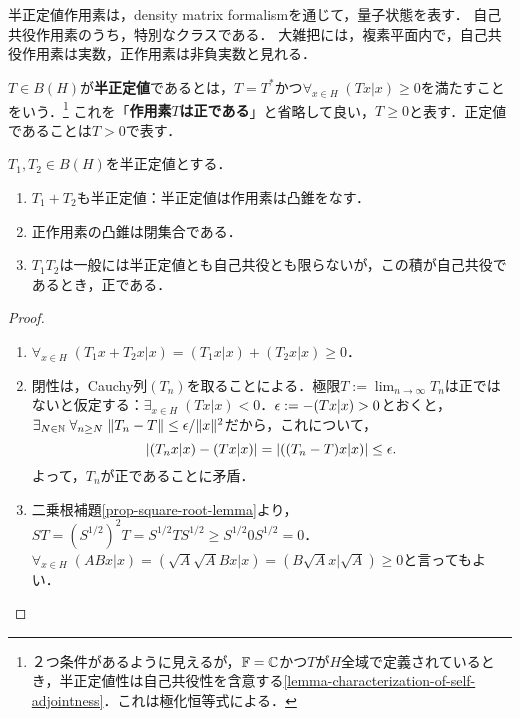 \documentclass[uplatex,dvipdfmx]{jsreport}
\begin{document}
\begin{tcolorbox}[colframe=ForestGreen, colback=ForestGreen!10!white,breakable,colbacktitle=ForestGreen!40!white,coltitle=black,fonttitle=\bfseries\sffamily,
title=]
    半正定値作用素は，density matrix formalismを通じて，量子状態を表す．
    自己共役作用素のうち，特別なクラスである．
    大雑把には，複素平面内で，自己共役作用素は実数，正作用素は非負実数と見れる．
\end{tcolorbox}

\begin{definition}\label{def-positive-operator}
    $T\in B(H)$が\textbf{半正定値}であるとは，$T=T^*$かつ$\forall_{x\in H}\;(Tx|x)\ge 0$を満たすことをいう．\footnote{２つ条件があるように見えるが，$\mathbb{F}=\mathbb{C}$かつ$T$が$H$全域で定義されているとき，半正定値性は自己共役性を含意する\ref{lemma-characterization-of-self-adjointness}．これは極化恒等式による．}
    これを「\textbf{作用素$T$は正である}」と省略して良い，$T\ge 0$と表す．正定値であることは$T>0$で表す．
\end{definition}

\begin{lemma}[正作用素の閉凸錐]\label{lemma-positive-closed-cone-of-positive-operator}
    $T_1,T_2\in B(H)$を半正定値とする．
    \begin{enumerate}
        \item $T_1+T_2$も半正定値：半正定値は作用素は凸錐をなす．
        \item 正作用素の凸錐は閉集合である．
        \item $T_1T_2$は一般には半正定値とも自己共役とも限らないが，この積が自己共役であるとき，正である．
    \end{enumerate}
\end{lemma}
\begin{proof}\mbox{}
    \begin{enumerate}
        \item $\forall_{x\in H}\;(T_1x+T_2x|x)=(T_1x|x)+(T_2x|x)\ge0$．
        \item 閉性は，Cauchy列$(T_n)$を取ることによる．極限$T:=\lim_{n\to\infty}T_n$は正ではないと仮定する：$\exists_{x\in H}\;(Tx|x)<0$．$\epsilon:=-(Tx|x)>0$とおくと，$\exists_{N\in\mathbb{N}}\;\forall_{n\ge N}\;\|T_n-T\|\le\epsilon/\|x\|^2$だから，これについて，
        \[\left|(T_nx|x)-(Tx|x)\right|=\lvert((T_n-T)x|x)\rvert\le\epsilon.\]
        よって，$T_n$が正であることに矛盾．
        \item 二乗根補題\ref{prop-square-root-lemma}より，$ST=(S^{1/2})^2T=S^{1/2}TS^{1/2}\ge S^{1/2}0S^{1/2}=0$．
        $\forall_{x\in H}\;(ABx|x)=(\sqrt{A}\sqrt{A}Bx|x)=(B\sqrt{A}x|\sqrt{A})\ge0$と言ってもよい．
    \end{enumerate}
\end{proof}
\end{document}
